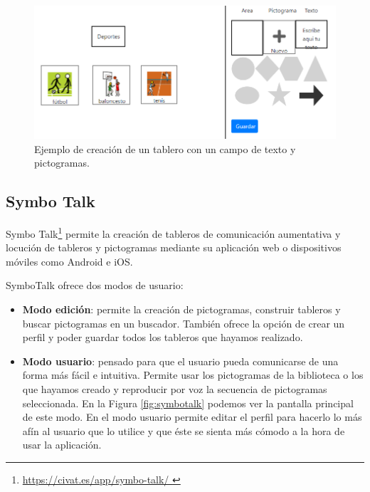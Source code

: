 \begin{itemize}
	\begin{figure}[h!]
		\centering
		\includegraphics[width=0.7\linewidth]{Imagenes/Bitmap/tableroPicTableros}
		\caption{Ejemplo de creación de un tablero con un campo de texto y pictogramas.}
		\label{fig:tableropictableros}
	\end{figure}
	
	
\end{itemize}


	
\subsection{Symbo Talk}
\label{cap2:sec:symbotalk}
Symbo Talk\footnote{\url{  https://civat.es/app/symbo-talk/ }} permite la creación de tableros de comunicación aumentativa y locución de tableros y pictogramas mediante su aplicación web o dispositivos móviles como Android e iOS.

SymboTalk ofrece dos modos de usuario:

\begin{itemize}
	\item \textbf{Modo edición}: permite la creación de pictogramas, construir tableros y buscar pictogramas en un buscador. También ofrece la opción de crear un perfil y poder guardar todos los tableros que hayamos realizado.
	
	
	\item \textbf{Modo usuario}: pensado para que el usuario pueda comunicarse de una forma más fácil e intuitiva. Permite usar los pictogramas de la biblioteca o los que hayamos creado y reproducir por voz la secuencia de pictogramas seleccionada. En la Figura \ref{fig:symbotalk} podemos ver la pantalla principal de este modo. En el modo usuario permite editar el perfil para hacerlo lo más afín al usuario que lo utilice y que éste se sienta más cómodo a la hora de usar la aplicación.
	
	
\end{itemize}

